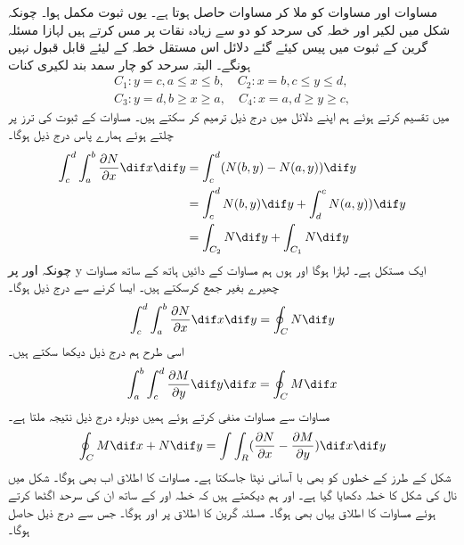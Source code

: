  مساوات    اور   مساوات   کو ملا کر مساوات     حاصل ہوتا ہے۔ یوں ثبوت مکمل ہوا۔   
 چونکہ شکل    میں لکیر  اور  خطہ کی سرحد کو دو سے زیادہ نقات پر مس کرتے ہیں لہازا مسئلہ  گرین کے ثبوت میں پیس کیئے گئے دلائل اس مستقل خطہ کے لیئے قابل قبول نہیں ہونگے۔ البتہ سرحد   کو چار سمد بند لکیری کنات  
\begin{align}
     C_1: y =c, a \leq x \leq b, \quad C_2: x=b, c \leq y \leq d,\\     
     C_3: y=d, b \geq x \geq a, \quad C_4: x=a, d \geq y \geq c, 
\end{align}
 میں تقسیم کرتے ہوئے ہم اپنے دلائل میں درج ذیل ترمیم کر سکتے ہیں۔ مساوات   کے ثبوت کی ترز پر چلتے ہوئے ہمارے پاس درج ذیل ہوگا۔ 
\begin{align}
     \int_{c}^{d} \int_{a}^{b} \frac{\partial N}{\partial x} \dif x \dif y &= \int_{c}^{d} (N(b,y)-N(a,y)) \dif y\\     &= \int_{c}^{d} N(b,y) \dif y + \int_{d}^{c} N(a,y)) \dif y\\     &= \int_{C_2} N \dif y + \int_{C_1} N \dif y 
\end{align}
 چونکہ   اور   پر  y ایک مستکل ہے۔ لہازا  ہوگا اور ہوں ہم مساوات     کے دائیں ہاتھ کے ساتھ   مساوات چھیرے بغیر جمع کرسکتے ہیں۔ ایسا کرنے سے درج ذیل ہوگا۔  
\begin{align}
     \int_c^d \int_{a}^{b} \frac{\partial N}{\partial x} \dif x \dif y = \oint_C N \dif y 
\end{align}
 اسی طرح ہم درج ذیل دیکھا سکتے ہیں۔ 
\begin{align}
     \int_{a}^{b} \int_c^d  \frac{\partial M}{\partial y} \dif y \dif x  = \oint_C M \dif x 
\end{align}
 مساوات     سے مساوات     منفی کرتے ہوئے ہمیں دوبارہ درج ذیل نتیجہ ملتا ہے۔ 
\begin{align}
     \oint_C M \dif x + N \dif y = \int \int_R (\frac{\partial N}{\partial x} - \frac{\partial M}{\partial y}) \dif x \dif y 
\end{align}
 شکل    کے طرز کے خطوں کو بھی با آسانی نپٹا جاسکتا ہے۔ مساوات     کا اطلاق اب بھی ہوگا۔ شکل      میں نال کی شکل کا خطہ  دکھایا گیا ہے۔  اور ہم دیکھتے  ہیں کہ خطہ  اور   کے ساتھ ان کی سرحد اگٹھا کرتے ہوئے مساوات      کا اطلاق یہاں بھی ہوگا۔  مسلئہ  گرین کا اطلاق   پر اور  ہوگا۔ جس سے درج ذیل حاصل ہوگا۔ 
